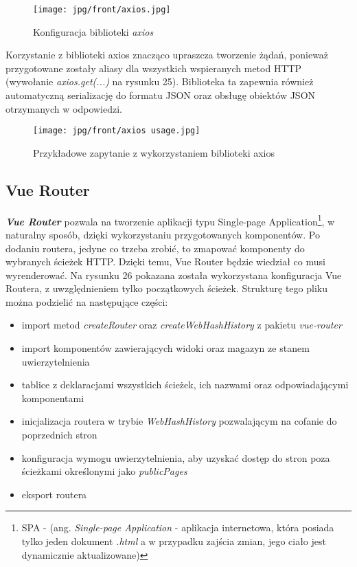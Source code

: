 \documentclass[11pt,a4paper]{article}
\begin{document}
\begin{figure}[H]
    \centering
    \texttt{[image: jpg/front/axios.jpg]}
    \caption{Konfiguracja biblioteki \textsl{axios}}
\end{figure}

\noindent
Korzystanie z biblioteki axios znacząco upraszcza tworzenie żądań, ponieważ przygotowane zostały aliasy dla wszystkich wspieranych metod HTTP (wywołanie \textsl{axios.get(...)} na rysunku 25). Biblioteka ta zapewnia również automatyczną serializację do formatu JSON oraz obsługę obiektów JSON otrzymanych w odpowiedzi.

\begin{figure}[H]
    \centering
    \texttt{[image: jpg/front/axios usage.jpg]}
    \caption{Przykładowe zapytanie z wykorzystaniem biblioteki axios}
\end{figure}

\subsection{Vue Router}

\textsl{\textbf{Vue Router}} \cite{vue-router} pozwala na tworzenie aplikacji typu Single-page Application\footnote{SPA - (ang. \textsl{Single-page Application} \cite{spa} - aplikacja internetowa, która posiada tylko jeden dokument \textsl{.html} a w przypadku zajścia zmian, jego ciało jest dynamicznie aktualizowane)}, w naturalny sposób, dzięki wykorzystaniu przygotowanych komponentów. Po dodaniu routera, jedyne co trzeba zrobić, to zmapować komponenty do wybranych ścieżek HTTP. Dzięki temu, Vue Router będzie wiedział co musi wyrenderować. Na rysunku 26 pokazana została wykorzystana konfiguracja Vue Routera, z uwzględnieniem tylko początkowych ścieżek. Strukturę tego pliku można podzielić na następujące części:

\begin{itemize}
    \item import metod \textsl{createRouter} oraz \textsl{createWebHashHistory} z pakietu \textsl{vue-router}
    \item import komponentów zawierających widoki oraz magazyn ze stanem uwierzytelnienia
    \item tablice z deklaracjami wszystkich ścieżek, ich nazwami oraz odpowiadającymi komponentami
    \item inicjalizacja routera w trybie \textsl{WebHashHistory} pozwalającym na cofanie do poprzednich stron
    \item konfiguracja wymogu uwierzytelnienia, aby uzyskać dostęp do stron poza ścieżkami określonymi jako \textsl{publicPages}
    \item eksport routera
\end{itemize}
\end{document}
